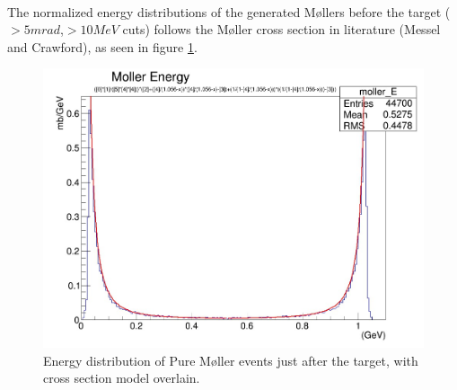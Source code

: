 \documentclass{article}
\begin{document}
\paragraph{}
The normalized energy distributions of the generated M\o llers before the target ($>5mrad$,$>10 MeV$ cuts) follows the M\o ller cross section in literature (Messel and Crawford), as seen in figure \ref{fig:XS}. %


\begin{figure}[H]
  	\includegraphics[width=\linewidth]{MollerPlots/MollerXS.jpg}
  	\caption{Energy distribution of Pure M\o ller events just after the target, with cross section model overlain.}
  	\label{fig:XS}
	\end{figure}
\end{document}
